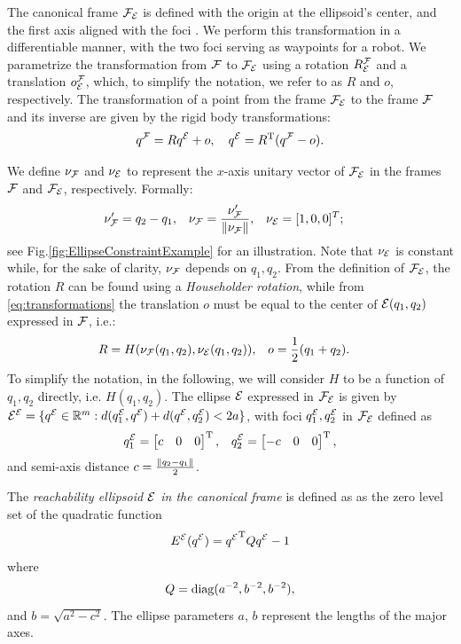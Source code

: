 \documentclass[journal]{IEEEtran}  %
\begin{document}
The canonical frame $\mathcal{F}_{\mathcal{E}}$ is defined with the origin at the ellipsoid's center, and the first axis aligned with the foci  . We perform this transformation in a differentiable manner, with the two foci serving as waypoints for a robot.
We parametrize the transformation from $\mathcal{F}$ to $\mathcal{F}_{\mathcal{E}}$ using a rotation $R^{\mathcal{F}}_{\mathcal{E}}$ and a translation $o^{\mathcal{F}}_{\mathcal{E}}$, which, to simplify the notation, we refer to as $R$ and $o$, respectively. 
The transformation of a point from the frame $\mathcal{F}_{\mathcal{E}}$ to the frame $\mathcal{F}$ and its inverse are given by the rigid body transformations:
  \begin{equation}\label{eq:transformations}
    {q^{\mathcal{F}}}=R{q^{\mathcal{E}}}+o,\quad
    {q^{\mathcal{E}}}=R^\mathrm{T}({q^{\mathcal{F}}}-o).
  \end{equation}
 
  We define $\nu_{\mathcal{F}}$ and $\nu_{\mathcal{E}}$ to represent the $x$-axis unitary vector of $\mathcal{F}_{\mathcal{E}}$ in the frames $\mathcal{F}$ and $\mathcal{F}_{\mathcal{E}}$, respectively. Formally:
  \begin{align}
    \nu'_{\mathcal{F}}&=q_2-q_1, & \nu_{\mathcal{F}} &= \frac{\nu'_{\mathcal{F}}}{\lVert\nu_{\mathcal{F}}\rVert}, & \nu_{\mathcal{E}}&=[1,0,0]^T;
  \end{align}
  see Fig.\ref{fig:EllipseConstraintExample} for an illustration. Note that $\nu_{\mathcal{E}}$ is constant while, for the sake of clarity, $\nu_{\mathcal{F}}$ depends on $q_1,q_2$. From the definition of $\mathcal{F}_{\mathcal{E}}$, the rotation $R$ can be found using a \emph{Householder rotation}, while from \eqref{eq:transformations} the translation $o$ must be equal to the center of $\mathcal{E}(q_1,q_2)$ expressed in $\mathcal{F}$, i.e.:
  \begin{align} 
    R&=H(\nu_{\mathcal{F}}(q_1,q_2),\nu_{\mathcal{E}}(q_1,q_2)), &o&=\frac{1}{2}(q_1+q_2).
  \end{align}
  To simplify the notation, in the following, we will consider $H$ to be a function of $q_1,q_2$ directly, i.e. $H(q_1,q_2)$. 
  The ellipse $\mathcal{E}$ expressed in $\mathcal{F}_{\mathcal{E}}$ is given by ${\mathcal{E}^{\mathcal{E}}}=\{{q^{\mathcal{E}}}\in\mathbb{R}^{m}{}:d(q^{\mathcal{E}}_1,{q^{\mathcal{E}}})+d({q^{\mathcal{E}}},q^{\mathcal{E}}_2)<2a\}$, with foci $q^{\mathcal{E}}_1,q^{\mathcal{E}}_2$ in $\mathcal{F}_{\mathcal{E}}$ defined as
  \begin{align}
    q^{\mathcal{E}}_1=\begin{bmatrix}c & 0 & 0\end{bmatrix}^\mathrm{T}, && q^{\mathcal{E}}_2=\begin{bmatrix}-c & 0 & 0\end{bmatrix}^\mathrm{T},
  \end{align}
  and semi-axis distance $c=\frac{\lVert q_2-q_1\rVert}{2}$.
\begin{definition}
  The \emph{reachability ellipsoid $\mathcal{E}$ in the canonical frame} is defined as as the zero level set of the quadratic function
  \begin{equation}\label{equ:standard-ellipse}
    {E^{\mathcal{E}}}({q^{\mathcal{E}}}) = {q^{\mathcal{E}}}^\mathrm{T} Q {q^{\mathcal{E}}} - 1
  \end{equation}
  where
  \begin{equation}
    Q = \operatorname{diag}(a^{-2},b^{-2},b^{-2}),
  \end{equation}
  and $b = \sqrt{a^2-c^2}$.
  The ellipse parameters $a$, $b$ represent the lengths of the major axes.
\end{definition}
\end{document}
